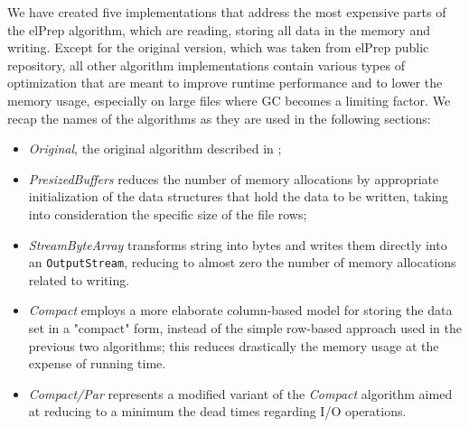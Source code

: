 \documentclass[a4paper,twoside]{article}
\begin{document}
We have created five implementations that address the most expensive parts of the elPrep algorithm, which are reading,  storing all data in the memory and writing.
Except for the original version, which was taken from elPrep public repository, all other algorithm implementations contain various types of optimization that are meant to improve runtime performance and to lower the memory usage, especially on large files where GC becomes a limiting factor. 
We recap the names of the algorithms as they are used in the following sections:
\begin{itemize}
\item {\it Original}, the original algorithm described in \cite{costanza:2019};

\item {\it PresizedBuffers} reduces the number of memory allocations by appropriate initialization of the data structures that hold the data to be written, taking into consideration the specific size of the file rows;

\item {\it StreamByteArray} transforms string into bytes and writes them directly into an \texttt{OutputStream}, reducing to almost zero the number of memory allocations related to writing.

\item {\it Compact} employs a more elaborate column-based model for storing the data set in a "compact" form, instead of the simple row-based approach used in the previous two algorithms; this reduces drastically the memory usage at the expense of running time.

\item {\it Compact/Par} represents a modified variant of the {\it Compact} algorithm aimed at reducing to a minimum the dead times regarding I/O operations.

\end{itemize}
\end{document}
